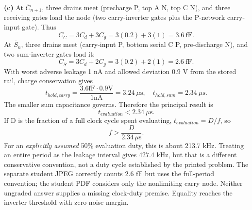 \documentclass[10pt]{article}
\begin{document}
\textbf{(c)} At $\bar C_{n+1}$, three drains meet (precharge P, top A N, top C N), and three receiving gates load the node (two carry-inverter gates plus the P-network carry-input gate). Thus
\[C_{\bar C}=3C_d+3C_g=3(0.2)+3(1)=3.6\ \mathrm{fF}.\]
At $\bar S_n$, three drains meet (carry-input P, bottom serial C P, pre-discharge N), and two sum-inverter gates load it:
\[C_{\bar S}=3C_d+2C_g=3(0.2)+2(1)=2.6\ \mathrm{fF}.\]
With worst adverse leakage 1 nA and allowed deviation 0.9 V from the stored rail, charge conservation gives
\[t_{hold,carry}=\frac{3.6\mathrm{fF}\cdot0.9\mathrm V}{1\mathrm{nA}}=3.24\ \mu\mathrm s,
\quad t_{hold,sum}=2.34\ \mu\mathrm s.\]
The smaller sum capacitance governs. Therefore the principal result is
\[\boxed{t_{evaluation}<2.34\ \mu\mathrm s.}\]
If D is the fraction of a full clock cycle spent evaluating, $t_{evaluation}=D/f$, so
\[\boxed{f>\frac{D}{2.34\,\mu\mathrm s}.}\]
For an \emph{explicitly assumed} 50\% evaluation duty, this is about 213.7 kHz. Treating an entire period as the leakage interval gives 427.4 kHz, but that is a different conservative convention, not a duty cycle established by the printed problem. The separate student JPEG correctly counts 2.6 fF but uses the full-period convention; the student PDF considers only the nonlimiting carry node. Neither ungraded answer supplies a missing clock-duty premise. Equality reaches the inverter threshold with zero noise margin.
\end{document}
